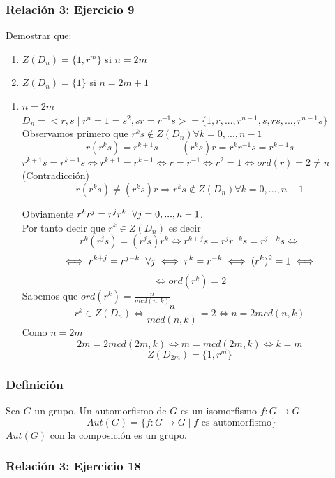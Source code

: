 \documentclass[11pt,a4paper]{article}
\begin{document}
\subsubsection*{Relación 3: Ejercicio 9}

Demostrar que:
\begin{enumerate}[label=$\alph*)$]
\item $Z(D_{n}) = \{1, r^{m}\}$ si $n = 2m$
\item $Z(D_{n}) = \{1\}$ si $n = 2m + 1$
\end{enumerate}

\begin{enumerate}[label=$\alph*)$]
\item $n = 2m$ \\
$D_{n} = <r,s \mid r^{n} = 1 = s^{2}, sr = r^{-1}s> = \{1, r, ..., r^{n-1}, s, rs, ..., r^{n-1}s\}$ \\
Observamos primero que $r^{k}s \notin Z(D_{n}) \forall k = 0, ..., n-1$
$$r(r^{k}s) = r^{k+1}s \hspace{1cm} (r^{k}s)r = r^{k}r^{-1}s = r^{k-1}s$$
$r^{k+1}s = r^{k-1}s \iff r^{k+1} = r^{k-1} \iff r = r^{-1} \iff r^{2} = 1 \iff ord(r) = 2 \neq n$ (Contradicción)
$$r(r^{k}s) \neq (r^{k}s)r \Rightarrow r^{k}s \notin Z(D_{n}) \forall k = 0, ..., n-1$$

Obviamente $r^{k}r^{j} = r^{j}r^{k} \hspace{0.2cm} \forall j = 0, ..., n-1$. \\
Por tanto decir que $r^{k} \in Z(D_{n})$ es decir
$$r^{k}(r^{j}s) = (r^{j}s)r^{k} \iff r^{k+j}s = r^{j}r^{-k}s = r^{j-k}s \iff$$ $$\iff r^{k+j} = r^{j-k} \hspace{0.2cm} \forall j \iff r^{k} = r^{-k} \iff (r^{k})^{2} = 1 \iff$$ $$\iff ord(r^{k}) = 2$$
Sabemos que $ord(r^{k}) = \frac{n}{mcd(n,k)}$
$$r^{k} \in Z(D_{n}) \iff \frac{n}{mcd(n,k)} = 2 \iff n = 2 mcd(n,k)$$
Como $n = 2m$
$$2m = 2 mcd(2m,k) \iff m = mcd(2m, k) \iff k = m$$
$$Z(D_{2m}) = \{1, r^{m}\}$$
\end{enumerate}

\subsubsection*{Definición}

Sea $G$ un grupo. Un automorfismo de $G$ es un isomorfismo $f: G \to G$
$$Aut(G) = \{f: G \to G \mid f \text{ es automorfismo}\}$$
$Aut(G)$ con la composición es un grupo.

\subsubsection*{Relación 3: Ejercicio 18}
\end{document}

